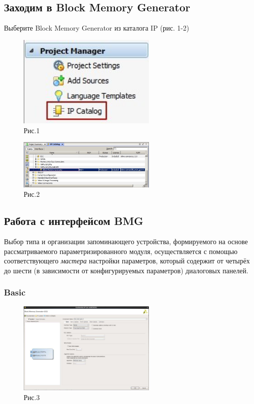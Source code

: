 \subsection{Заходим в Block Memory Generator} 
Выберите Block Memory Generator из каталога IP (рис. 1-2)
\begin{figure}[h]
\centering
\includegraphics[width=0.6\textwidth]{1}
\caption{Рис.1}
\label{1_label}
\end{figure}
\begin{figure}[h]
\centering
\includegraphics[width=0.6\textwidth]{2}
\caption{Рис.2}
\label{2_label}
\end{figure}
\subsection{Работа с интерфейсом BMG} 
 Выбор типа и организации запоминающего устройства, формируемого на основе рассматриваемого параметризированного модуля, осуществляется с помощью соответствующего \emph {мастера} настройки параметров, который содержит от четырёх до шести (в зависимости от конфигурируемых параметров) диалоговых панелей.
\subsubsection{Basic}

\begin{figure}[h]
\centering
\includegraphics[width=0.6\textwidth]{3}
\caption{Рис.3}
\label{3_label}
\end{figure}


